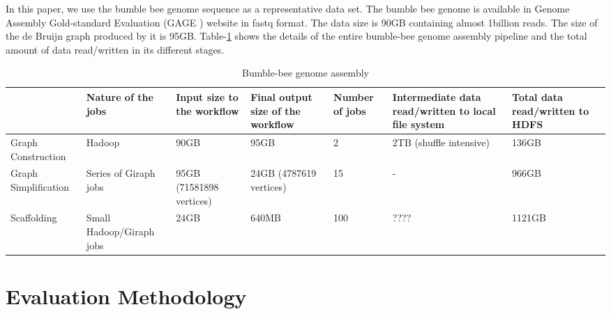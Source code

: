 \documentclass[conference]{IEEEtran}
\begin{document}
In this paper, we use the bumble bee genome sequence as a representative data set.
The bumble bee genome is available in Genome Assembly Gold-standard Evaluation (GAGE \cite{bio:gage}) website in fastq format.
The data size is 90GB containing almost 1billion reads.
The size of the de Bruijn graph produced by it is 95GB.
Table-\ref{table:BumbleBeeData} shows the details of the entire bumble-bee genome assembly pipeline and the total amount of data read/written in its different stages.

\begin{table}
\begin{center}
    \begin{tabular}{ |p{1.3cm} | p{1.3cm} | p{1.3cm} | p{1.3cm} | p{1.3cm} | p{1.3cm} | p{1.3cm}|} \hline
    & Nature of the jobs & Input size to the workflow & Final output size of the workflow & Number of jobs & Intermediate data read/written to local file system & Total data read/written to HDFS \\ \hline
    Graph Construction & Hadoop & 90GB & 95GB & 2 & 2TB (shuffle intensive) & 136GB \\ \hline
    Graph Simplification & Series of Giraph jobs & 95GB (71581898 vertices) & 24GB (4787619 vertices) & 15 & - & 966GB \\ \hline
    Scaffolding & Small Hadoop/Giraph jobs & 24GB & 640MB & 100 & ???? & 1121GB \\ \hline    
    \end{tabular}
    \caption{Bumble-bee genome assembly}
	\label{table:BumbleBeeData}
\end{center}
\end{table}

\section {Evaluation Methodology} \label{Evaluation Methodology}
\end{document}
